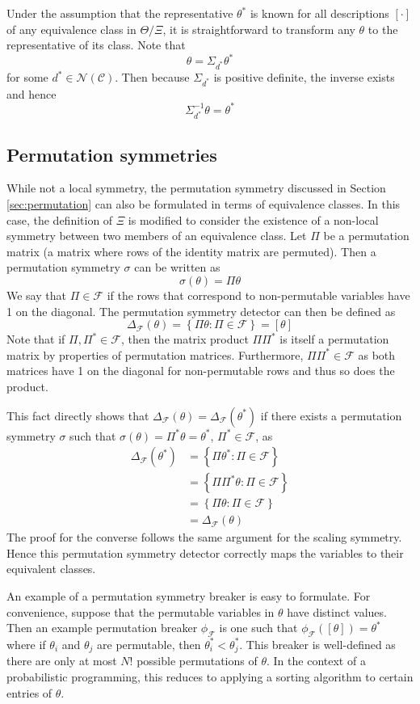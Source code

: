 Under the assumption that the representative $\theta^*$ is known for all descriptions $[\cdot]$ of any equivalence class in $\Theta/\Xi$, it is straightforward to transform any $\theta$ to the representative of its class. Note that
\[
\theta = \Sigma_{d^*}\theta^*
\]
for some $d^*\in\mathcal{N}(\mathcal{C})$. Then because $\Sigma_{d^*}$ is positive definite, the inverse exists and hence
\[
\Sigma_{d^*}^{-1}\theta = \theta^*
\]


\subsection{Permutation symmetries}

While not a local symmetry, the permutation symmetry discussed in Section \ref{sec:permutation} can also be formulated in terms of equivalence classes. In this case, the definition of $\Xi$ is modified to consider the existence of a non-local symmetry between two members of an equivalence class. Let $\Pi$ be a permutation matrix (a matrix where rows of the identity matrix are permuted). Then a permutation symmetry $\sigma$ can be written as
\[
\sigma(\theta)=\Pi\theta
\]
We say that $\Pi\in\mathcal{F}$ if the rows that correspond to non-permutable variables have 1 on the diagonal. The permutation symmetry detector can then be defined as
\[
\Delta_\mathcal{F}(\theta) = \left\{\Pi\theta:\Pi\in\mathcal{F}\right\} = [\theta]
\]
Note that if $\Pi,\Pi^*\in\mathcal{F}$, then the matrix product $\Pi\Pi^*$ is itself a permutation matrix by properties of permutation matrices. Furthermore, $\Pi\Pi^*\in\mathcal{F}$ as both matrices have 1 on the diagonal for non-permutable rows and thus so does the product.

This fact directly shows that $\Delta_\mathcal{F}(\theta)=\Delta_\mathcal{F}(\theta^*)$ if there exists a permutation symmetry $\sigma$ such that $\sigma(\theta)=\Pi^*\theta=\theta^*$, $\Pi^*\in\mathcal{F}$, as
\begin{align*}
\Delta_\mathcal{F}(\theta^*) &= \left\{\Pi\theta^*:\Pi\in\mathcal{F}\right\} \\
&= \left\{\Pi\Pi^*\theta:\Pi\in\mathcal{F}\right\} \\
&= \left\{\Pi\theta:\Pi\in\mathcal{F}\right\} \\
&= \Delta_\mathcal{F}(\theta)
\end{align*}
The proof for the converse follows the same argument for the scaling symmetry. Hence this permutation symmetry detector correctly maps the variables to their equivalent classes.

An example of a permutation symmetry breaker is easy to formulate. For convenience, suppose that the permutable variables in $\theta$ have distinct values. Then an example permutation breaker $\phi_\mathcal{F}$ is one such that $\phi_\mathcal{F}([\theta])=\theta^*$ where if $\theta_i$ and $\theta_j$ are permutable, then $\theta^*_i<\theta^*_j$. This breaker is well-defined as there are only at most $N!$ possible permutations of $\theta$. In the context of a probabilistic programming, this reduces to applying a sorting algorithm to certain entries of $\theta$.


